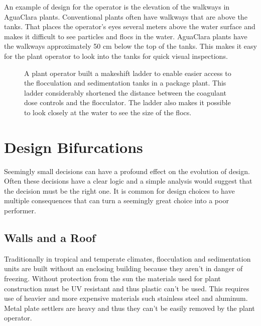 \documentclass[letterpaper,10pt,english]{sphinxmanual}
\let\sphinxpxdimen\pdfpxdimen\else\newdimen\sphinxpxdimen
\begin{document}
An example of design for the operator is the elevation of the walkways in AguaClara plants. Conventional plants often have walkways that are above the tanks. That places the operator’s eyes several meters above the water surface and makes it difficult to see particles and flocs in the water. AguaClara plants have the walkways approximately 50 cm below the top of the tanks. This makes it easy for the plant operator to look into the tanks for quick visual inspections.

\begin{figure}[htbp]
\centering
\capstart

\noindent\sphinxincludegraphics[width=300\sphinxpxdimen]{{Improvised_ladder_access_to_sed_tank}.jpg}
\caption{A plant operator built a makeshift ladder to enable easier access to the flocculation and sedimentation tanks in a package plant. This ladder considerably shortened the distance between the coagulant dose controls and the flocculator. The ladder also makes it possible to look closely at the water to see the size of the flocs.}\label{\detokenize{Introduction/Introduction:id22}}\label{\detokenize{Introduction/Introduction:figure}}\end{figure}


\section{Design Bifurcations}
\label{\detokenize{Introduction/Introduction:design-bifurcations}}\label{\detokenize{Introduction/Introduction:heading-design-bifurcations}}
Seemingly small decisions can have a profound effect on the evolution of design. Often these decisions have a clear logic and a simple analysis would suggest that the decision must be the right one. It is common for design choices to have multiple consequences that can turn a seemingly great choice into a poor performer.


\subsection{Walls and a Roof}
\label{\detokenize{Introduction/Introduction:walls-and-a-roof}}\label{\detokenize{Introduction/Introduction:heading-walls-and-a-roof}}
Traditionally in tropical and temperate climates, flocculation and sedimentation units are built without an enclosing building because they aren’t in danger of freezing. Without protection from the sun the materials used for plant construction must be UV resistant and thus plastic can’t be used. This requires use of heavier and more expensive materials such stainless steel and aluminum. Metal plate settlers are heavy and thus they can’t be easily removed by the plant operator.
\end{document}
